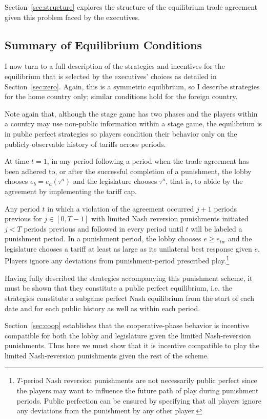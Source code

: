 \documentclass[authoryear, review]{elsarticle}
\begin{document}
Section~\ref{sec:structure} explores the structure of the equilibrium trade agreement given this problem faced by the executives.

\subsection{Summary of Equilibrium Conditions}
\label{sec:nashrev}
I now turn to a full description of the strategies and incentives for the equilibrium that is selected by the executives' choices as detailed in Section~\ref{sec:zero}. Again, this is a symmetric equilibrium, so I describe strategies for the home country only; similar conditions hold for the foreign country.

Note again that, although the stage game has two phases and the players within a country may use non-public information within a stage game, the equilibrium is in public perfect strategies so players condition their behavior only on the publicly-observable history of tariffs across periods.

At time $t=1$, in any period following a period when the trade agreement has been adhered to, or after the successful completion of a punishment, the lobby chooses $e_b =e_a(\tau^a)$ and the legislature chooses $\tau^a$, that is, to abide by the agreement by implementing the tariff cap.

Any period $t$ in which a violation of the agreement occurred $j+1$ periods previous for $j \in [0,T-1]$ with limited Nash reversion punishments initiated $j<T$ periods previous and followed in every period until $t$ will be labeled a punishment period. In a punishment period, the lobby chooses $e \geq e_{tw}$ and the legislature chooses a tariff at least as large as its unilateral best response given $e$. Players ignore any deviations from punishment-period prescribed play.\footnote{$T$-period Nash reversion punishments are not necessarily public perfect since the players may want to influence the future path of play during punishment periods. Public perfection can be ensured by specifying that all players ignore any deviations from the punishment by any other player.}

Having fully described the strategies accompanying this punishment scheme, it must be shown that they constitute a public perfect equilibrium, i.e. the strategies constitute a subgame perfect Nash equilibrium from the start of each date and for each public history as well as within each period.
		
Section~\ref{sec:coop} establishes that the cooperative-phase behavior is incentive compatible for both the lobby and legislature given the limited Nash-reversion punishments. Thus here we must show that it is incentive compatible to play the limited Nash-reversion punishments given the rest of the scheme.
\end{document}
